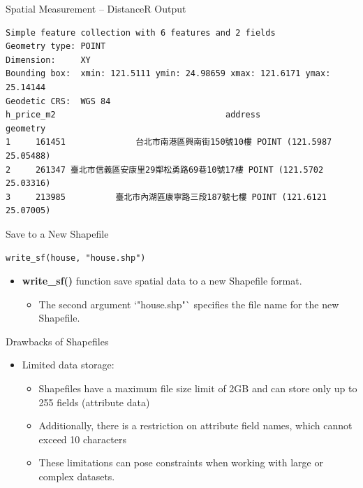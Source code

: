 \documentclass[hyperref={pdfpagelabels=false}]{beamer}
\begin{document}
\begin{frame}[fragile]{Spatial Measurement -- Distance}{R Output}

\tiny

\begin{lstlisting}
Simple feature collection with 6 features and 2 fields
Geometry type: POINT
Dimension:     XY
Bounding box:  xmin: 121.5111 ymin: 24.98659 xmax: 121.6171 ymax: 25.14144
Geodetic CRS:  WGS 84
h_price_m2                                  address                  geometry
1     161451              台北市南港區興南街150號10樓 POINT (121.5987 25.05488)
2     261347 臺北市信義區安康里29鄰松勇路69巷10號17樓 POINT (121.5702 25.03316)
3     213985          臺北市內湖區康寧路三段187號七樓 POINT (121.6121 25.07005)
\end{lstlisting}


\end{frame}

\begin{frame}[fragile]{Save to a New Shapefile}
\begin{lstlisting}
write_sf(house, "house.shp")
\end{lstlisting}
\begin{itemize}
	\item \textbf{write\_sf()} function save spatial data to a new Shapefile format.
	\vspace{0.2cm}
	\begin{itemize}
		
		\item The second argument `"house.shp"` specifies the file name for the new Shapefile.
	\end{itemize}

\end{itemize}
\end{frame}


\begin{frame}[fragile]{Drawbacks of Shapefiles}
	\begin{itemize}
		
		\item Limited data storage:
		\vspace{0.2cm}
		\begin{itemize}
			\item Shapefiles have a maximum file size limit of 2GB and can store only up to 255 fields (attribute data)
			\vspace{0.2cm}
			\item Additionally, there is a restriction on attribute field names, which cannot exceed 10 characters
						\vspace{0.2cm}
			\item These limitations can pose constraints when working with large or complex datasets.
		\end{itemize}
	
	\end{itemize}
\end{frame}
\end{document}

